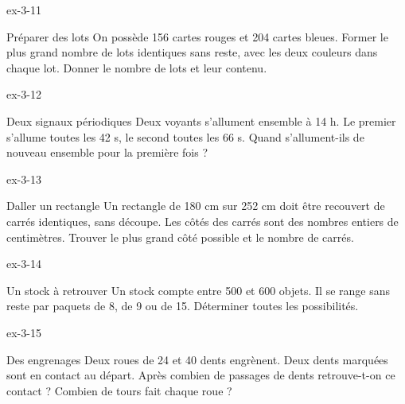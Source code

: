 \clearpage{}
\begin{blocLivre}{ex-3-11}\begin{exercice}[3]{Préparer des lots}
On possède 156 cartes rouges et 204 cartes bleues. Former le plus grand nombre de lots identiques sans reste, avec les deux couleurs dans chaque lot. Donner le nombre de lots et leur contenu.
\end{exercice}\end{blocLivre}
\begin{blocLivre}{ex-3-12}\begin{exercice}[3]{Deux signaux périodiques}
Deux voyants s’allument ensemble à 14 h. Le premier s’allume toutes les 42 s, le second toutes les 66 s. Quand s’allument-ils de nouveau ensemble pour la première fois ?
\end{exercice}\end{blocLivre}
\begin{blocLivre}{ex-3-13}\begin{exercice}[3]{Daller un rectangle}
Un rectangle de 180 cm sur 252 cm doit être recouvert de carrés identiques, sans découpe. Les côtés des carrés sont des nombres entiers de centimètres. Trouver le plus grand côté possible et le nombre de carrés.
\label{fig-ex-3-13}
\end{exercice}\end{blocLivre}
\begin{blocLivre}{ex-3-14}\begin{exercice}[3]{Un stock à retrouver}
Un stock compte entre 500 et 600 objets. Il se range sans reste par paquets de 8, de 9 ou de 15. Déterminer toutes les possibilités.
\end{exercice}\end{blocLivre}
\begin{blocLivre}{ex-3-15}\begin{exercice}[3]{Des engrenages}
Deux roues de 24 et 40 dents engrènent. Deux dents marquées sont en contact au départ. Après combien de passages de dents retrouve-t-on ce contact ? Combien de tours fait chaque roue ?
\label{fig-ex-3-15}
\end{exercice}\end{blocLivre}

\clearpage
